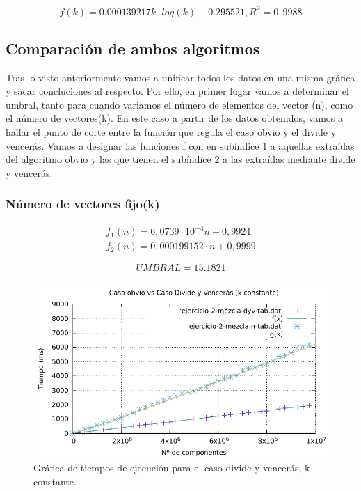 \begin{equation}
    \boxed{f(k) = 0.000139217 k \cdot log(k) - 0.295521, R^2 = 0,9988}
    \label{eq:2b-ajuste-k}
\end{equation}

\subsection{Comparación de ambos algoritmos}

Tras lo visto anteriormente vamos a unificar todos los datos en una misma gráfica y sacar concluciones al respecto. Por ello, en primer lugar vamos a determinar el umbral,
tanto para cuando variamos el número de elementos del vector (n), como el número de vectores(k). 
En este caso a partir de los datos obtenidos, vamos a hallar el punto de corte entre
la función que regula el caso obvio y el divide y vencerás. 
Vamos a designar las funciones f con en subíndice 1 a aquellas extraídas del algoritmo obvio y las que tienen el subíndice 2 a las extraídas mediante
divide y vencerás.

\subsubsection{Número de vectores fijo(k)}

\begin{eqnarray}
    f_1(n) = 6,0739 \cdot 10 ^{-4}  n + 0,9924 \\
    f_2(n) = 0,000199152 \cdot n + 0,9999
\end{eqnarray} 

\begin{equation}
   \boxed{UMBRAL = 15.1821}
\end{equation}

\begin{figure}[h]
    \centering
    \includegraphics[scale=0.76]{img/2-umbral-n.pdf}
    \caption{Gráfica de tiempos de ejecución para el caso divide y vencerás, k constante.}
\end{figure}

